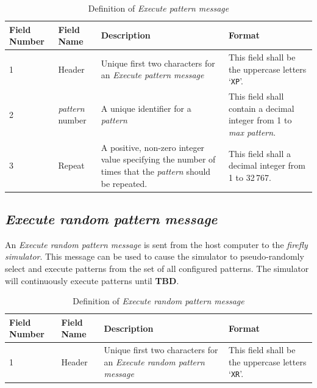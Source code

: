 \documentclass[letterpaper,11pt]{article}
\begin{document}
\begin{table}[H]
  \caption{Definition of \textit{Execute pattern message}}
  \centering
  \setlength\extrarowheight{2pt}
  \begin{tabular}[h]{|p{0.5in}|p{1.00in}|p{2.25in}|p{2.25in}|} \hline
    Field Number & Field Name & Description & Format \\ \hline
    1            & Header
                 & Unique first two characters for an \textit{Execute pattern
                 message}
                 & This field shall be the uppercase letters `\texttt{XP}'.
                 \\ \hline
    2            & \textit{pattern} number
                 & A unique identifier for a \textit{pattern}
                 & This field shall contain a decimal integer from 1 to
                 \textit{max pattern}.
                 \\ \hline
    3            & Repeat
                 & A positive, non-zero integer value specifying the number of
                 times that the \textit{pattern} should be repeated. 
                 & This field shall a decimal integer from 1 to 32\,767.
                 \\ \hline
  \end{tabular}
  \label{tab:ExecutePattern}
\end{table}

\subsection{\textit{Execute random pattern message}}

An \textit{Execute random pattern message} is sent from the host computer to the
\textit{firefly simulator}. This message can be used to cause the simulator to
pseudo-randomly select and execute patterns from the set of all configured
patterns. The simulator will continuously execute patterns until \textbf{TBD}.

\begin{table}[H]
  \caption{Definition of \textit{Execute random pattern message}}
  \centering
  \setlength\extrarowheight{2pt}
  \begin{tabular}[h]{|p{0.5in}|p{1.00in}|p{2.25in}|p{2.25in}|} \hline
    Field Number & Field Name & Description & Format \\ \hline
    1            & Header
                 & Unique first two characters for an \textit{Execute random
                 pattern message}
                 & This field shall be the uppercase letters `\texttt{XR}'.
                 \\ \hline
  \end{tabular}
  \label{tab:ExecuteRandom}
\end{table}
\end{document}
